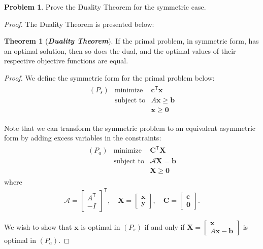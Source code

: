 \documentclass[12pt]{article}
\theoremstyle{definition}
\newtheorem{problem}{Problem}
\newcommand{\vc}[1]{\boldsymbol{#1}}
\newcommand{\tran}{\mathsf{T}}
\newtheorem{theorem}{Theorem}
\begin{document}
\begin{problem}
  Prove the Duality Theorem for the symmetric case.
\end{problem}

\begin{proof}
  The Duality Theorem is presented below:
  \begin{theorem}[\textbf{\emph{Duality Theorem}}] If the primal problem, in symmetric form,
    has an optimal solution, then so does the dual, and the optimal values of their
    respective objective functions are equal.
  \end{theorem}

  \emph{Proof.} We define the symmetric form for the primal problem below:
  \begin{align*}
    \begin{array}{lrl}
      (P_s) & \text{minimize} & \vc{c}^\tran \vc{x} \\
      & \text{subject to} & A\vc{x} \geq \vc{b} \\
      & & \vc{x} \geq \vc{0}
    \end{array}
  \end{align*}

  Note that we can transform the symmetric problem to an equivalent asymmetric form
  by adding excess variables in the constraints:
  \begin{align*}
    \begin{array}{lrl}
      (P_a) & \text{minimize} & \vc{C}^\tran \vc{X} \\
      & \text{subject to} & \mathscr{A}\vc{X} = \vc{b} \\
      & & \vc{X} \geq \vc{0}
    \end{array}
  \end{align*}
  where
  \begin{align*}
    \mathscr{A} = \begin{bmatrix}A^\tran \\ -I\end{bmatrix}^\tran, \quad \vc{X} = \begin{bmatrix}\vc{x} \\ \vc{y}\end{bmatrix},
    \quad \vc{C} = \begin{bmatrix}\vc{c} \\ \vc{0}\end{bmatrix}.
  \end{align*}

  We wish to show that $\vc{x}$ is optimal in $(P_s)$ if and only if $\vc{X} = \begin{bmatrix}\vc{x} \\ A\vc{x} - \vc{b}\end{bmatrix}$
  is optimal in $(P_a)$.


\end{proof}
\end{document}
